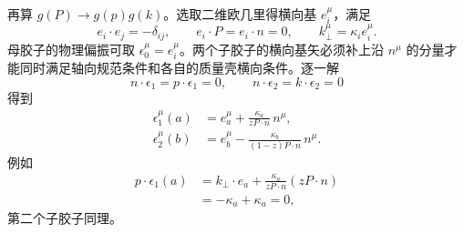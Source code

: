 \begin{derivation}
再算 $g(P)\to g(p)g(k)$。选取二维欧几里得横向基 $e_i^\mu$，满足
\begin{equation*}
 e_i\cdot e_j=-\delta_{ij},
 \qquad e_i\cdot P=e_i\cdot n=0,
 \qquad k_\perp^\mu=\kappa_i e_i^\mu.
\end{equation*}
母胶子的物理偏振可取 $\epsilon_0^\mu=e_i^\mu$。两个子胶子的横向基矢必须补上沿 $n^\mu$ 的分量才能同时满足轴向规范条件和各自的质量壳横向条件。逐一解
\begin{equation*}
 n\cdot\epsilon_1=p\cdot\epsilon_1=0,
 \qquad
 n\cdot\epsilon_2=k\cdot\epsilon_2=0
\end{equation*}
得到
\begin{align*}
 \epsilon_1^\mu(a)
 &=e_a^\mu+\frac{\kappa_a}{zP\cdot n}\,n^\mu,\\
 \epsilon_2^\mu(b)
 &=e_b^\mu-\frac{\kappa_b}{(1-z)P\cdot n}\,n^\mu.
\end{align*}
例如
\begin{align*}
 p\cdot\epsilon_1(a)
 &=k_\perp\cdot e_a
 +\frac{\kappa_a}{zP\cdot n}(zP\cdot n)\\
 &=-\kappa_a+\kappa_a=0,
\end{align*}
第二个子胶子同理。


\end{derivation}
